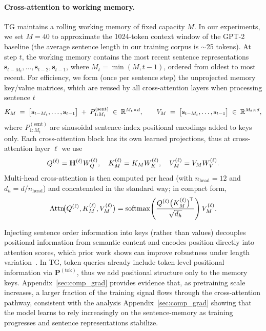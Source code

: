 \documentclass{article}
\begin{document}
\paragraph{Cross-attention to working memory.}
TG maintains a rolling working memory of fixed capacity $M$. In our experiments, we set $M=40$ to approximate the 1024-token context window of the GPT-2 baseline (the average sentence length in our training corpus is $\sim$25 tokens).
At step $t$, the working memory contains the most recent sentence representations
$\mathbf{s}_{t-M_t}, \ldots, \mathbf{s}_{t-2}, \mathbf{s}_{t-1}$, where
$M_t = \min(M, t-1)$, ordered from oldest to most recent. For efficiency, we form (once per sentence step) the unprojected memory key/value matrices, which are reused by all cross-attention layers when processing sentence $t$ 
\vspace{0.2cm}
\[
K_M \;=\; \big[\mathbf{s}_{t-M_t},\ldots,\mathbf{s}_{t-1}\big] \;+\; P^{(\text{sent})}_{1:M_t}
\;\in\; \mathbb{R}^{M_t\times d},
\qquad
V_M \;=\; \big[\mathbf{s}_{t-M_t},\ldots,\mathbf{s}_{t-1}\big]
\;\in\; \mathbb{R}^{M_t\times d},
\vspace{0.2cm}
\]
where $P^{(\text{sent})}_{1:M_t}$ are sinusoidal sentence-index positional encodings added to keys only.
Each cross-attention block has its own learned projections, thus at cross-attention layer $\ell$ we use
\vspace{0.2cm}
\[
Q^{(\ell)}=\mathbf{H}^{(\ell)} W_Q^{(\ell)},\quad
K_M^{(\ell)}=K_M W_K^{(\ell)},\quad
V_M^{(\ell)}=V_M W_V^{(\ell)}.
\vspace{0.2cm}
\]
Multi-head cross-attention is then computed per head (with $n_{\text{head}}{=}12$ and
$d_h{=}d/n_{\text{head}}$) and concatenated in the standard way; in compact form,
\vspace{0.2cm}
\[
\mathrm{Attn}\!\big(Q^{(\ell)},K_M^{(\ell)},V_M^{(\ell)}\big)
=
\mathrm{softmax}\!\left(\frac{Q^{(\ell)} \big(K_M^{(\ell)}\big)^{\!\top}}{\sqrt{d_h}}\right)
V_M^{(\ell)}.
\vspace{0.2cm}
\]


Injecting sentence order information into keys (rather than values) decouples positional information from semantic content and encodes position directly into attention scores, which prior work shows can improve
robustness under length variation~\citep{press2021shortformer,press2022alibi,miyazaki-etal-2024-understanding}.
In TG, token queries already include token-level positional information via $\mathbf{P}^{(\text{tok})}$, thus
we add positional structure only to the memory keys.
Appendix~\ref{sec:comp_grad} provides evidence that, as pretraining scale increases, a
larger fraction of the training signal flows through the cross-attention pathway, consistent with the analysis 
Appendix~\ref{sec:comp_grad} showing that the
model learns to rely increasingly on the sentence-memory as training progresses and sentence representations stabilize. 
\end{document}
